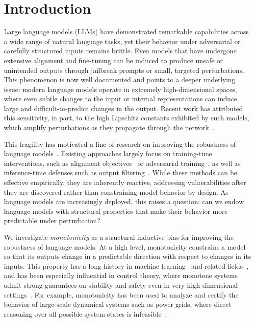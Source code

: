 \documentclass{article}
\theoremstyle{plain}
\theoremstyle{definition}
\theoremstyle{remark}
\begin{document}
\section{Introduction}
\label{sec:intro}

Large language models (LLMs) have demonstrated remarkable capabilities across a wide range of natural language tasks, yet their behavior under adversarial or carefully structured inputs remains brittle. Even models that have undergone extensive alignment and fine-tuning can be induced to produce unsafe or unintended outputs through jailbreak prompts or small, targeted perturbations. This phenomenon is now well documented and points to a deeper underlying issue: modern language models operate in extremely high-dimensional spaces, where even subtle changes to the input or internal representations can induce large and difficult-to-predict changes in the output. Recent work has attributed this sensitivity, in part, to the high Lipschitz constants exhibited by such models, which amplify perturbations as they propagate through the network~\cite{newhouse2025training}.

This fragility has motivated a line of research on improving the robustness of language models~\cite{salah2026jailbreaking, su2024mission}. Existing approaches largely focus on training-time interventions, such as alignment objectives~\cite{cao2024defending} or adversarial training~\cite{howe2024effects}, as well as inference-time defenses such as output filtering~\cite{khachaturov2025adversarial}. While these methods can be effective empirically, they are inherently reactive, addressing vulnerabilities after they are discovered rather than constraining model behavior by design. As language models are increasingly deployed, this raises a question: can we endow language models with structural properties that make their behavior more predictable under perturbation?


We investigate \emph{monotonicity} as a structural inductive bias for improving the robustness of language models. At a high level, monotonicity constrains a model so that its outputs change in a predictable direction with respect to changes in its inputs. This property has a long history in machine learning~\cite{Gupta2016MonotonicLattices, runje2023constrained} and related fields~\cite{smith1995monotone}, and has been especially influential in control theory, where monotone systems admit strong guarantees on stability and safety even in very high-dimensional settings~\cite{michel2015stability,ito2014max}. For example, monotonicity has been used to analyze and certify the behavior of large-scale dynamical systems such as power grids, where direct reasoning over all possible system states is infeasible~\cite{rantzer2014control}.
\end{document}
